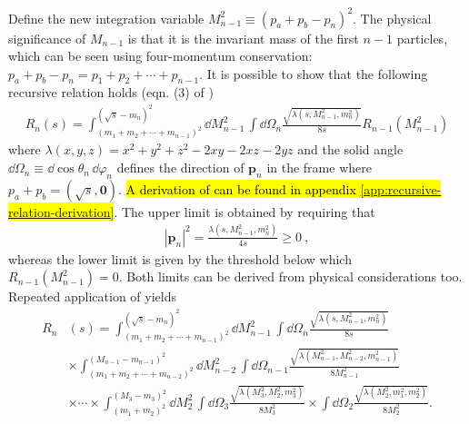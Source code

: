 Define the new integration variable $M_{n-1}^2 \equiv (p_a + p_b - p_n)^2$. The physical significance of $M_{n-1}$ is that it is the invariant mass of the first $n-1$ particles, which can be seen using four-momentum conservation: $p_a + p_b - p_n = p_1 + p_2 + \cdots + p_{n-1}$.
It is possible to show that the following recursive relation holds (eqn. (3) of \cite{Byckling:1969sx})
\begin{align}
    \label{eq:recursive-phase-space-relation}
    R_n(s) = 
    \int_{(m_1 + m_2 + \cdots + m_{n-1})^2}^{(\sqrt{s} - m_n)^2} 
    \dd M^2_{n-1} \, \int \dd \Omega_n
    \frac{\sqrt{\lambda(s, M_{n-1}^2, m_n^2)}}{8s} R_{n-1}(M_{n-1}^2)
\end{align}
where $\lambda(x, y, z) = x^2 + y^2 + z^2 - 2 xy - 2 xz - 2yz$ and the solid angle $\dd \Omega_n \equiv \dd \cos \theta_n\, \dd \varphi_n$ defines the direction of $\bm{p}_n$ in the frame where $p_a + p_b = (\sqrt{s}, \bm{0})$. 
\hl{A derivation of {} can be found in appendix {\ref{app:recursive-relation-derivation}}}.
The upper limit is obtained by requiring that 
\begin{align}
    |\bm{p}_n|^2 = \frac{\lambda(s, M_{n-1}^2, m_n^2)}{4 s} \geq 0\ ,
\end{align}
whereas the lower limit is given by the threshold below which $R_{n-1}(M_{n-1}^2) = 0$.
Both limits can be derived from physical considerations too.
 Repeated application of  yields 
\begin{equation}
\begin{aligned}
    R_n&(s) 
        = 
    \int_{(m_1 + m_2 + \cdots + m_{n-1})^2}^{(\sqrt{s} - m_n)^2}
    \dd M^2_{n-1} \,  \int \dd \Omega_n
    \frac{\sqrt{\lambda(s, M_{n-1}^2, m_n^2)}}{8s} \\
        &\times 
    \int_{(m_1 + m_2 + \cdots + m_{n-2})^2}^{(M_{n-1} - m_{n-1})^2}
    \dd M^2_{n-2}  \, \int \dd \Omega_{n-1}
    \frac{\sqrt{\lambda(M_{n-1}^2, M_{n-2}^2, m_{n-1}^2)}}{8M_{n-1}^2} \\
        &\times \cdots \times
    \int_{(m_1 + m_2)^2}^{(M_3 - m_3)^2}
    \dd M^2_{2}  \, \int \dd \Omega_{3}
    \frac{\sqrt{\lambda(M_{3}^2, M_{2}^2, m_{3}^2)}}{8M_{3}^2} 
    \times 
    \int \dd \Omega_2
    \frac{\sqrt{\lambda(M_{2}^2, m_1^2, m_{2}^2)}}{8M_{2}^2}. 
\end{aligned}
\end{equation}

